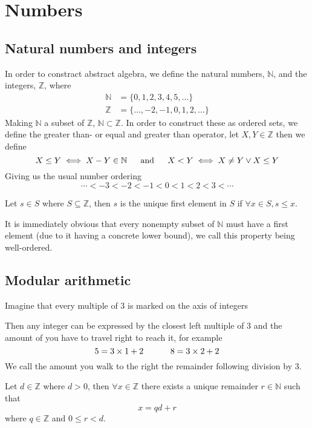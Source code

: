 \section{Numbers}
\subsection{Natural numbers and integers}
In order to constract abstract algebra, we define the natural numbers, $\mathbb{N}$, and the integers, $\mathbb{Z}$, where
\begin{align*}
    \mathbb{N}&=\{0,1,2,3,4,5,\ldots\} \\
    \mathbb{Z}&=\{\ldots,-2,-1,0,1,2,\ldots\}
\end{align*}
Making $\mathbb{N}$ a subset of $\mathbb{Z}$, $\mathbb{N}\subset\mathbb{Z}$. In order to construct these as ordered sets, we define the greater than- or equal and  greater than operator, let $X,Y\in\mathbb{Z}$ then we define
\[
    X\leq Y\iff X-Y\in\mathbb{N}\hskip 16pt \text{and}\hskip 16pt X<Y\iff X\neq Y\vee X\leq Y
\]
Giving us the usual number ordering
\[
    \cdots<-3<-2<-1<0<1<2<3<\cdots
\]\vskip -10pt
\begin{defi}
    Let $s\in S$ where $S\subseteq\mathbb{Z}$, then $s$ is the unique first element in $S$ if $\forall x\in S,s\leq x$.
\end{defi}
It is immediately obvious that every nonempty subset of $\mathbb{N}$ must have a first element (due to it having a concrete lower bound), we call this property being well-ordered.
\pagebreak\subsection{Modular arithmetic}
Imagine that every multiple of 3 is marked on the axis of integers
\begin{figure}[!h]
    \centering
\end{figure}
Then any integer can be expressed by the closest left multiple of 3 and the amount of you have to travel right to reach it, for example 
\[
    5=3\times 1+2\hskip 32pt8=3\times 2+2
\]
We call the amount you walk to the right the remainder following division by 3.
\begin{theo}
    Let $d\in\mathbb{Z}$ where $d>0$, then $\forall x\in\mathbb{Z}$ there exists a unique remainder $r\in\mathbb{N}$ such that
    \[
        x=qd+r
    \]
    where $q\in\mathbb{Z}$ and $0\leq r<d$.
\end{theo}
